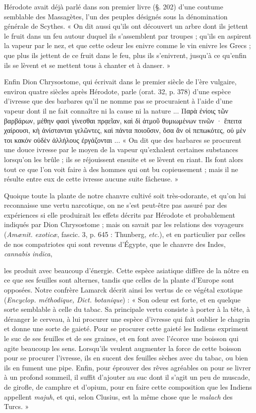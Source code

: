 \documentclass[a4paper, 11pt, oneside, polutonikogreek, french]{article}
\begin{document}
Hérodote avait déjà parlé dans son premier livre (§. 202) d'une coutume semblable des Massagètes, l'un des peuples désignés sous la dénomination générale de Scythes. « On dit aussi qu'ils ont découvert un arbre dont ils jettent le fruit dans un feu autour duquel ils s'assemblent par troupes ; qu'ils en aspirent la vapeur par le nez, et que cette odeur les enivre comme le vin enivre les Grecs ; que plus ils jettent de ce fruit dans le feu, plus ils s'enivrent, jusqu'à ce qu'enfin ils se lèvent et se mettent tous à chanter et à danser. »

Enfin Dion Chrysostome, qui écrivait dans le premier siècle de l'ère vulgaire, environ quatre siècles après Hérodote, parle (orat. 32, p. 378) d'une espèce d'ivresse que des barbares qu'il ne nomme pas se procuraient à l'aide d'une vapeur dont il ne fait connaître ni la cause ni la nature ... Παρὰ ἐνίοις τῶν βαρβάρων, μέθην φασὶ γίνεσθαι πρᾳεῖαν, καὶ δἰ ἀτμοῦ θυμιωμένων τινῶν · ἕπειτα χαίρουσι, κὴ ἀνίστανται γελῶντες, καὶ πάντα ποιοῦσιν, ὅσα ἂν οἱ πεπωκότες, οὐ μὲν τοι κακόν οὐδὲν ἀλλήλους ἐργάζονται ... « On dit que des barbares se procurent une douce ivresse par le moyen de la vapeur qu'exhalent certaines substances lorsqu'on les brûle ; ils se réjouissent ensuite et se lèvent en riant. Ils font alors tout ce que l'on voit faire à des hommes qui ont bu copieusement ; mais il ne résulte entre eux de cette ivresse aucune suite fâcheuse. »

Quoique toute la plante de notre chanvre cultivé soit très-odorante, et qu'on lui reconnaisse une vertu narcotique, on ne s'est peut-être pas assuré par des expériences si elle produirait les effets décrits par Hérodote et probablement indiqués par Dion Chrysostome ; mais on savait par les relations des voyageurs (\emph{Amænit. exoticæ}, fascic. 3, p. 645 : Thunberg, \emph{etc.}), et en particulier par celles de nos compatriotes qui sont revenus d'Égypte, que le chanvre des Indes, \emph{cannabis indica},

les produit avec beaucoup d'énergie. Cette espèce asiatique diffère de la nôtre en ce que ses feuilles sont alternes, tandis que celles de la plante d'Europe sont opposées. Notre confrère Lamarck décrit ainsi les vertus de ce végétal exotique (\emph{Encyclop. méthodique, Dict. botanique}) : « Son odeur est forte, et en quelque sorte semblable à celle du tabac. Sa principale vertu consiste à porter à la tête, à déranger le cerveau, à lui procurer une espèce d'ivresse qui fait oublier le chagrin et donne une sorte de gaieté. Pour se procurer cette gaieté les Indiens expriment le suc de ses feuilles et de ses graines, et en font avec l'écorce une boisson qui agite beaucoup les sens. Lorsqu'ils veulent augmenter la force de cette boisson pour se procurer l'ivresse, ils en sucent des feuilles sèches avec du tabac, ou bien ils en fument une pipe. Enfin, pour éprouver des rêves agréables on pour se livrer à un profond sommeil, il suffit d'ajouter au suc dont il s'agit un peu de muscade, de girofle, de camphre et d'opium, pour en faire cette composition que les Indiens appellent \emph{majuh}, et qui, selon Clusius, est la même chose que le \emph{malach} des Turcs. »
\end{document}
